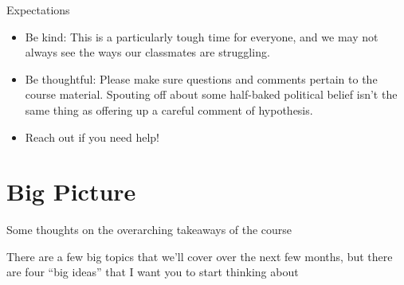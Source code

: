\documentclass[
  12pt,
]{article}
\begin{document}
Expectations

\begin{itemize}
\item
  Be kind: This is a particularly tough time for everyone, and we may
  not always see the ways our classmates are struggling.
\item
  Be thoughtful: Please make sure questions and comments pertain to the
  course material. Spouting off about some half-baked political belief
  isn't the same thing as offering up a careful comment of hypothesis.
\item
  Reach out if you need help!
\end{itemize}

\hypertarget{big-picture}{%
\section{Big Picture}\label{big-picture}}

Some thoughts on the overarching takeaways of the course

There are a few big topics that we'll cover over the next few months,
but there are four ``big ideas'' that I want you to start thinking about
\end{document}

